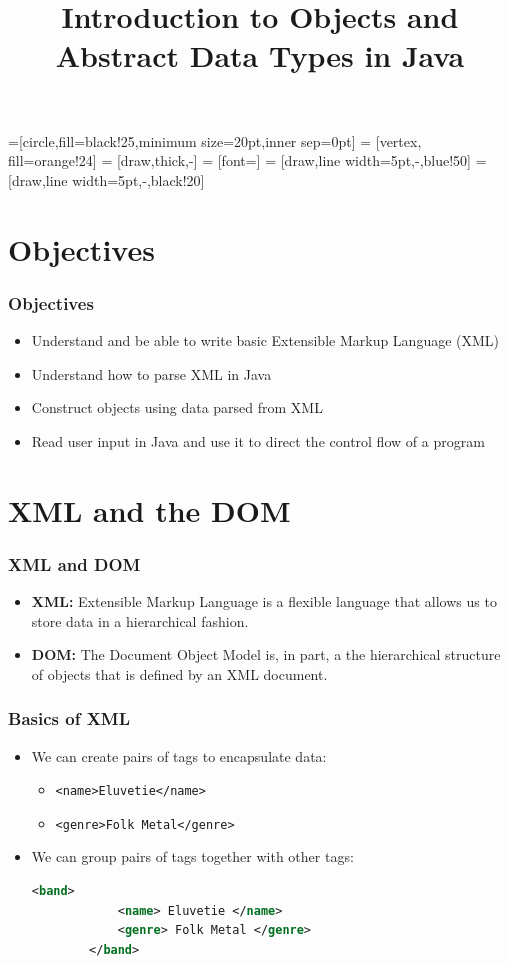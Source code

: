 \documentclass{beamer}
\title{\textbf{Introduction to Objects and Abstract Data Types in Java}}
\date{}
\begin{document}

=[circle,fill=black!25,minimum size=20pt,inner sep=0pt]
 = [vertex, fill=orange!24]
 = [draw,thick,-]
 = [font=\small]
 = [draw,line width=5pt,-,blue!50]
 = [draw,line width=5pt,-,black!20]


\frame{\titlepage}

\section{Objectives}
\begin{frame}
	\frametitle{Objectives}
    \centering
    \begin{itemize}
		\item Understand and be able to write basic Extensible Markup Language (XML)
        \item Understand how to parse XML in Java
        \item Construct objects using data parsed from XML
		\item Read user input in Java and use it to direct the control flow of a program
    \end{itemize}
\end{frame}


\section{XML and the DOM}
\begin{frame}
    \frametitle{XML and DOM}
    \begin{itemize}
        \item \textbf{XML: } Extensible Markup Language is a flexible language that allows us to store data in a hierarchical fashion.
        \item \textbf{DOM: } The Document Object Model is, in part, a the hierarchical structure of objects that is defined by an XML document.
    \end{itemize}
\end{frame}

\begin{frame}[fragile]
    \frametitle{Basics of XML}
    \begin{itemize}
        \item We can create pairs of tags to encapsulate data:
            \begin{itemize}
                \item \lstinline|<name>Eluvetie</name>|
                \item \lstinline|<genre>Folk Metal</genre>|
            \end{itemize}
        \item We can group pairs of tags together with other tags:
        \begin{lstlisting}[basicstyle=\scriptsize, language=XML]
        <band>
            <name> Eluvetie </name>
            <genre> Folk Metal </genre>
        </band>
        \end{lstlisting}
    \end{itemize}
\end{frame}
\end{document}
